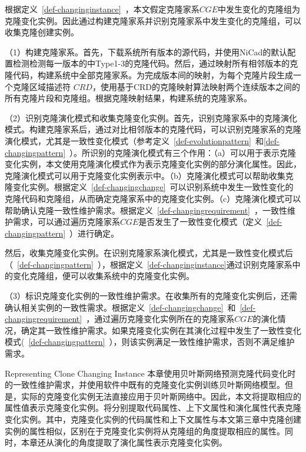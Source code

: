 根据定义~\ref{def-changinginstance}~，本文假定克隆家系$CGE$中发生变化的克隆组为克隆变化实例。因此通过构建克隆家系并识别克隆家系中发生变化的克隆组，可以收集克隆创建实例。

（1）构建克隆家系。首先，下载系统所有版本的源代码，并使用NiCad的默认配置检测检测每一版本的中Type1-3的克隆代码。然后，通过映射所有相邻版本的克隆代码，构建系统中全部克隆家系。为完成版本间的映射，为每个克隆片段生成一个克隆区域描述符 $CRD$\cite{duala2010clone}，使用基于CRD的克隆映射算法映射两个连续版本之间的所有克隆片段和克隆组\cite{ci2013new}\cite{ci2013newD}。根据克隆映射结果，构建系统的克隆家系。

（2）识别克隆演化模式和收集克隆变化实例。首先，识别克隆家系中的克隆演化模式。构建克隆家系后，通过对比相邻版本的克隆代码，可以识别克隆家系的克隆演化模式，尤其是一致性变化模式（参考定义~\ref{def-evolutionpattern}~和\ref{def-changingpattern}~）。所识别的克隆演化模式有三个作用：（a）可以用于表示克隆变化实例，本文使用克隆演化模式作为表示克隆变化实例的部分演化属性。因此，克隆演化模式可以用于克隆变化实例表示中。（b）克隆演化模式可以帮助收集克隆变化实例。根据定义~\ref{def-changingchange}~可以识别系统中发生一致性变化的克隆代码和克隆组，从而确定克隆家系中的克隆变化实例。（c）克隆演化模式可以帮助确认克隆一致性维护需求。根据定义~\ref{def-changingrequirement}~，一致性维护需求，可以通过遍历克隆家系$CGE$是否发生了一致性变化模式（定义~\ref{def-changingpattern}~）进行确定。

然后，收集克隆变化实例。在识别克隆家系演化模式，尤其是一致性变化模式后（~\ref{def-changingpattern}~），根据定义~\ref{def-changinginstance}通过识别克隆家系中的变化克隆组，便可以收集系统中的克隆变化实例。

（3）标识克隆变化实例的一致性维护需求。在收集所有的克隆变化实例后，还需确认相关实例的一致性需求。根据定义~\ref{def-changingchange}~和~\ref{def-changingrequirement}~，通过遍历克隆变化实例所在的克隆家系$CGE$的演化情况，确定其一致性维护需求。如果克隆变化实例在其演化过程中发生了一致性变化模式(~\ref{def-changingpattern}~），则该实例满足一致性维护需求，否则不满足维护需求。

{Representing Clone Changing Instance}
\label{lab-changingattribute}
本章使用贝叶斯网络预测克隆代码变化时的一致性维护需求，并使用软件中既有的克隆变化实例训练贝叶斯网络模型。但是，实际的克隆变化实例无法直接应用于贝叶斯网络中。因此，本文将提取相应的属性值表示克隆变化实例。将分别提取代码属性、上下文属性和演化属性代表克隆变化实例。其中，克隆变化实例的代码属性和上下文属性与本文第三章中克隆创建实例的属性相似，区别在于克隆变化实例将从克隆组的角度提取相应的属性。同时，本章还从演化的角度提取了演化属性表示克隆变化实例。

